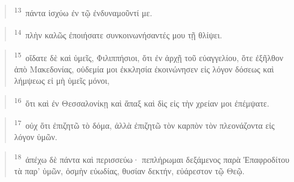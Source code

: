 \documentclass{article}
\newcommand{\currentverse}{1} %
\newcommand{\setcurrentverse}[1]{\renewcommand{\currentverse}{#1}}
\begin{document}
\begin{verse}

\setcurrentverse{13}

\setcounter{footnote}{0}

\textsuperscript{13}~πάντα ἰσχύω ἐν τῷ ἐνδυναμοῦντί με.

\end{verse}

\begin{verse}

\setcurrentverse{14}

\setcounter{footnote}{0}

\textsuperscript{14}~πλὴν καλῶς ἐποιήσατε συνκοινωνήσαντές μου τῇ θλίψει.

\end{verse}

\begin{verse}

\setcurrentverse{15}

\setcounter{footnote}{0}

\textsuperscript{15}~οἴδατε δὲ καὶ ὑμεῖς, Φιλιππήσιοι, ὅτι ἐν ἀρχῇ τοῦ εὐαγγελίου, ὅτε ἐξῆλθον ἀπὸ Μακεδονίας, οὐδεμία μοι ἐκκλησία ἐκοινώνησεν εἰς λόγον δόσεως καὶ λήμψεως εἰ μὴ ὑμεῖς μόνοι,

\end{verse}

\begin{verse}

\setcurrentverse{16}

\setcounter{footnote}{0}

\textsuperscript{16}~ὅτι καὶ ἐν Θεσσαλονίκῃ καὶ ἅπαξ καὶ δὶς εἰς τὴν χρείαν μοι ἐπέμψατε.

\end{verse}

\begin{verse}

\setcurrentverse{17}

\setcounter{footnote}{0}

\textsuperscript{17}~οὐχ ὅτι ἐπιζητῶ τὸ δόμα, ἀλλὰ ἐπιζητῶ τὸν καρπὸν τὸν πλεονάζοντα εἰς λόγον ὑμῶν.

\end{verse}

\begin{verse}

\setcurrentverse{18}

\setcounter{footnote}{0}

\textsuperscript{18}~ἀπέχω δὲ πάντα καὶ περισσεύω· πεπλήρωμαι δεξάμενος παρὰ Ἐπαφροδίτου τὰ παρ’ ὑμῶν, ὀσμὴν εὐωδίας, θυσίαν δεκτήν, εὐάρεστον τῷ Θεῷ.

\end{verse}
\end{document}
